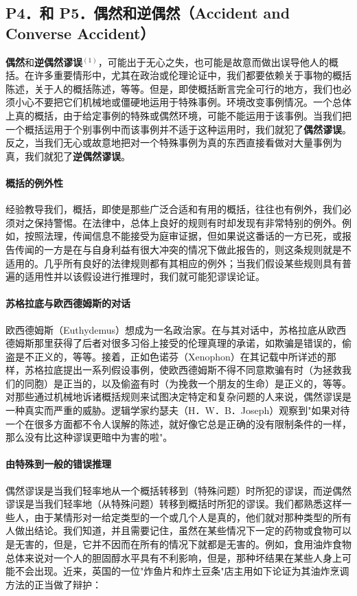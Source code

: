 \subsection{P4．和 P5．偶然和逆偶然（Accident and Converse Accident）}

\textbf{偶然}和\textbf{逆偶然谬误}${ }^{(1)}$，可能出于无心之失，也可能是故意而做出误导他人的概括。在许多重要情形中，尤其在政治或伦理论证中，我们都要依赖关于事物的概括陈述，关于人的概括陈述，等等。但是，即使概括断言完全可行的地方，我们也必须小心不要把它们机械地或僵硬地运用于特殊事例。环境改变事例情况。一个总体上真的概括，由于给定事例的特殊或偶然环境，可能不能运用于该事例。当我们把一个概括运用于个别事例中而该事例并不适于这种运用时，我们就犯了\textbf{偶然谬误}。反之，当我们无心或故意地把对一个特殊事例为真的东西直接看做对大量事例为真，我们就犯了\textbf{逆偶然谬误}。

\paragraph{概括的例外性}
经验教导我们，概括，即使是那些广泛合适和有用的概括，往往也有例外，我们必须对之保持警惕。在法律中，总体上良好的规则有时却发现有非常特别的例外。例如，按照法理，传闻信息不能接受为庭审证据，但如果说这番话的一方已死，或报告传闻的一方是在与自身利益有很大冲突的情况下做此报告的，则这条规则就是不适用的。几乎所有良好的法律规则都有其相应的例外；当我们假设某些规则具有普遍的适用性并以该假设进行推理时，我们就可能犯谬误论证。\\

\paragraph{苏格拉底与欧西德姆斯的对话}
欧西德姆斯（Euthydemus）想成为一名政治家。在与其对话中，苏格拉底从欧西德姆斯那里获得了后者对很多习俗上接受的伦理真理的承诺，如欺骗是错误的，偷盗是不正义的，等等。接着，正如色诺芬（Xenophon）在其记载中所详述的那样，苏格拉底提出一系列假设事例，使欧西德姆斯不得不同意欺骗有时（为拯救我们的同胞）是正当的，以及偷盗有时（为挽救一个朋友的生命）是正义的，等等。对那些通过机械地诉诸概括规则来试图决定特定和复杂问题的人来说，偶然谬误是一种真实而严重的威胁。逻辑学家约瑟夫（H．W．B．Joseph）观察到"如果对待一个在很多方面都不令人误解的陈述，就好像它总是正确的没有限制条件的一样，那么没有比这种谬误更暗中为害的啦"。

\paragraph{由特殊到一般的错误推理}
偶然谬误是当我们轻率地从一个概括转移到（特殊问题）时所犯的谬误，而逆偶然谬误是当我们轻率地（从特殊问题）转移到概括时所犯的谬误。我们都熟悉这样一些人，由于某情形对一给定类型的一个或几个人是真的，他们就对那种类型的所有人做出结论。我们知道，并且需要记住，虽然在某些情况下一定的药物或食物可以是无害的，但是，它并不因而在所有的情况下就都是无害的。例如，食用油炸食物总体来说对一个人的胆固醇水平具有不利影响，但是，那种坏结果在某些人身上可能不会出现。近来，英国的一位"炸鱼片和炸土豆条"店主用如下论证为其油炸烹调方法的正当做了辩护：

